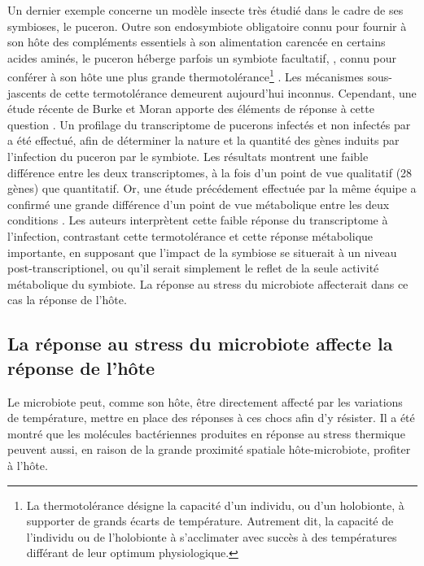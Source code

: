 Un dernier exemple concerne un modèle insecte très étudié dans le cadre de ses symbioses, le puceron.
Outre son endosymbiote obligatoire  connu pour fournir à son hôte des compléments essentiels à son alimentation carencée en certains acides aminés, le puceron  héberge parfois un symbiote facultatif, , connu pour conférer à son hôte une plus grande thermotolérance\footnote{La thermotolérance désigne la capacité d'un individu, ou d'un holobionte, à supporter de grands écarts de température. Autrement dit, la capacité de l'individu ou de l'holobionte à s'acclimater avec succès à des températures différant de leur optimum physiologique.} \cite{montllor2002}.
Les mécanismes sous-jascents de cette termotolérance demeurent aujourd'hui inconnus.
Cependant, une étude récente de Burke et Moran apporte des éléments de réponse à cette question \cite{burke2011}.
Un profilage du transcriptome de pucerons infectés et non infectés par  a été effectué, afin de déterminer la nature et la quantité des gènes induits par l'infection du puceron par le symbiote.
Les résultats montrent une faible différence entre les deux transcriptomes, à la fois d'un point de vue qualitatif (28 gènes) que quantitatif.
Or, une étude précédement effectuée par la même équipe a confirmé une grande différence d'un point de vue métabolique entre les deux conditions \cite{burke2009}.
Les auteurs interprètent cette faible réponse du transcriptome à l'infection, contrastant cette termotolérance et cette réponse métabolique importante, en supposant que l'impact de la symbiose se situerait à un niveau post-transcriptionel, ou qu'il serait simplement le reflet de la seule activité métabolique du symbiote.
La réponse au stress du microbiote affecterait dans ce cas la réponse de l'hôte.


\subsection{La réponse au stress du microbiote affecte la réponse de l'hôte}

Le microbiote peut, comme son hôte, être directement affecté par les variations de température, mettre en place des réponses à ces chocs afin d'y résister.
Il a été montré que les molécules bactériennes produites en réponse au stress thermique peuvent aussi, en raison de la grande proximité spatiale hôte-microbiote, profiter à l'hôte.

